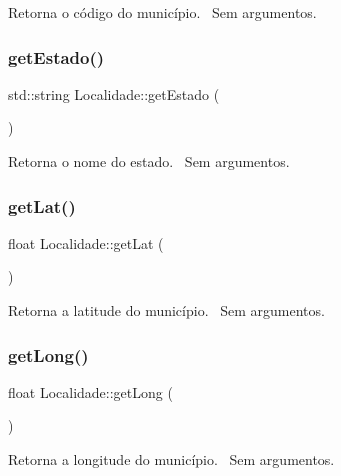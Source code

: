 Retorna o código do município.~\newline
Sem argumentos.\mbox{\label{classLocalidade_a3e32ae1802d8bd09568599f5133028d3}} 
\subsubsection{\texorpdfstring{get\+Estado()}{getEstado()}}
{\footnotesize\ttfamily std\+::string Localidade\+::get\+Estado (\begin{DoxyParamCaption}{ }\end{DoxyParamCaption})}

Retorna o nome do estado.~\newline
Sem argumentos.\mbox{\label{classLocalidade_a1548cf9f09eca346af5bdcc4c6f222b6}} 
\subsubsection{\texorpdfstring{get\+Lat()}{getLat()}}
{\footnotesize\ttfamily float Localidade\+::get\+Lat (\begin{DoxyParamCaption}{ }\end{DoxyParamCaption})}

Retorna a latitude do município.~\newline
Sem argumentos.\mbox{\label{classLocalidade_a97a3f7eabe1cf45e3f0bed721d4641d4}} 
\subsubsection{\texorpdfstring{get\+Long()}{getLong()}}
{\footnotesize\ttfamily float Localidade\+::get\+Long (\begin{DoxyParamCaption}{ }\end{DoxyParamCaption})}

Retorna a longitude do município.~\newline
Sem argumentos.\mbox{\label{classLocalidade_afd2127dad81d3131016f1dd4bcb9823b}} 
